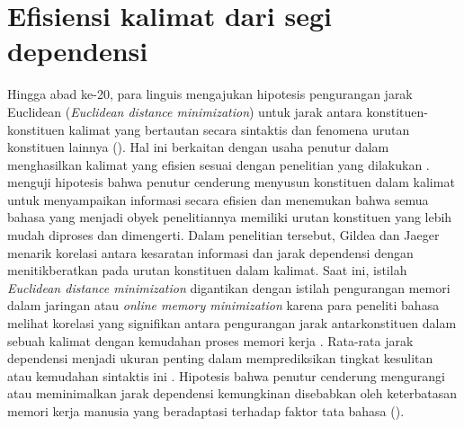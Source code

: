 \section{Efisiensi kalimat dari segi dependensi}
Hingga abad ke-20, para linguis mengajukan hipotesis pengurangan jarak Euclidean (\textit{Euclidean distance minimization}) untuk jarak antara konstituen-konstituen kalimat yang bertautan secara sintaktis dan fenomena urutan konstituen lainnya (\citealp{i2004euclidean, ferrer2008some}). Hal ini berkaitan dengan usaha penutur dalam menghasilkan kalimat yang efisien sesuai dengan penelitian yang dilakukan \cite{gildea2015human}. \cite{gildea2015human} menguji hipotesis bahwa penutur cenderung menyusun konstituen dalam kalimat untuk menyampaikan informasi secara efisien dan menemukan bahwa semua bahasa yang menjadi obyek penelitiannya memiliki urutan konstituen yang lebih mudah diproses dan dimengerti. Dalam penelitian tersebut, Gildea dan Jaeger menarik korelasi antara kesaratan informasi dan jarak dependensi dengan menitikberatkan pada urutan konstituen dalam kalimat. Saat ini, istilah \textit{Euclidean distance minimization} digantikan dengan istilah pengurangan memori dalam jaringan atau \textit{online memory minimization} karena para peneliti bahasa melihat korelasi yang signifikan antara pengurangan jarak antarkonstituen dalam sebuah kalimat dengan kemudahan proses memori kerja \citep{ferrer2015placement}. Rata-rata jarak dependensi menjadi ukuran penting dalam memprediksikan tingkat kesulitan atau kemudahan sintaktis ini \citep{hudson1995measuring}. Hipotesis bahwa penutur cenderung mengurangi atau meminimalkan jarak dependensi kemungkinan disebabkan oleh keterbatasan memori kerja manusia yang beradaptasi terhadap faktor tata bahasa (\citealp{i2004euclidean, ferrer2016non, buch2006discontinuous, liu2008dependency, gildea2010grammars, futrell2015large}).

